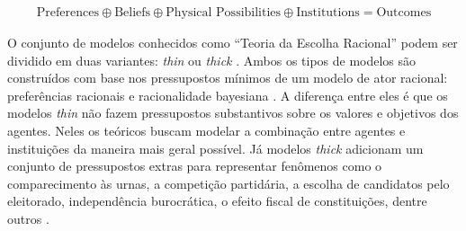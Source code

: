 \begin{align*}
  \text{Preferences} \oplus \text{Beliefs}  \oplus  \text{Physical Possibilities} \oplus \text{Institutions} = \text{Outcomes}
\end{align*}

O conjunto de modelos conhecidos como ``Teoria da Escolha Racional'' podem ser
dividido em duas variantes: \textit{thin} ou \textit{thick}
\cite{hechter1997sociological, green1996pathologies}. Ambos os tipos de modelos
são construídos com base nos pressupostos mínimos de um modelo de ator racional:
preferências racionais e racionalidade bayesiana \cite{gintis2016individuality}.
A diferença entre eles é que os modelos \textit{thin} não fazem pressupostos
substantivos sobre os valores e objetivos dos agentes. Neles os teóricos buscam
modelar a combinação entre agentes e instituições da maneira mais geral
possível. Já modelos \textit{thick} adicionam um conjunto de pressupostos extras
para representar fenômenos como o comparecimento às urnas, a competição
partidária, a escolha de candidatos pelo eleitorado, independência burocrática,
o efeito fiscal de constituições, dentre outros \cite{bendor2011behavioral}.









